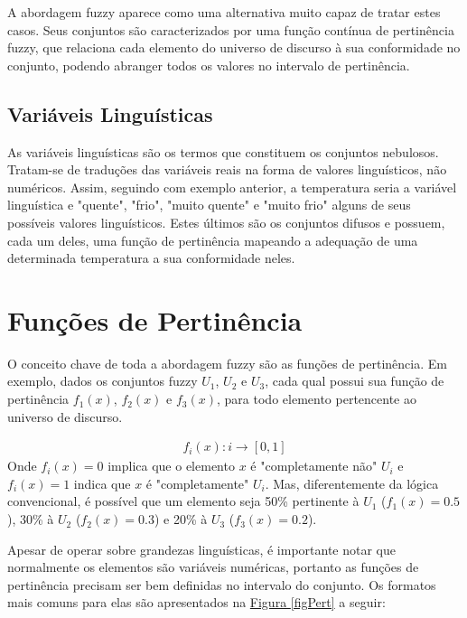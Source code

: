 A abordagem fuzzy aparece como uma alternativa muito capaz de tratar estes casos. Seus conjuntos são caracterizados por uma função contínua de pertinência fuzzy, que relaciona cada elemento do universo de discurso à sua conformidade no conjunto, podendo abranger todos os valores no intervalo de pertinência.

\subsection{Variáveis Linguísticas}
As variáveis linguísticas são os termos que constituem os conjuntos nebulosos. Tratam-se de traduções das variáveis reais na forma de valores linguísticos, não numéricos. Assim, seguindo com exemplo anterior, a temperatura seria a variável linguística e "quente", "frio", "muito quente" e "muito frio" alguns de seus possíveis valores linguísticos. Estes últimos são os conjuntos difusos e possuem, cada um deles, uma função de pertinência mapeando a adequação de uma determinada temperatura a sua conformidade neles.

\section{Funções de Pertinência}
\label{secFncPert}
O conceito chave de toda a abordagem fuzzy são as funções de pertinência. Em exemplo, dados os conjuntos fuzzy $U_1$, $U_2$ e $U_3$, cada qual possui sua função de pertinência $f_1(x)$, $f_2(x)$ e $f_3(x)$, para todo elemento pertencente ao universo de discurso.

\begin{align}
	f_i(x) : i \rightarrow [0,1]
	\label{eqFuncPertFuzzy}
\end{align}
Onde $f_i(x)=0$ implica que o elemento $x$ é "completamente não" $U_i$ e $f_i(x)=1$ indica que $x$ é "completamente" $U_i$. Mas, diferentemente da lógica convencional, é possível que um elemento seja 50\% pertinente à $U_1$ ($f_1(x)=0.5$), 30\%  à $U_2$ ($f_2(x)=0.3$) e 20\%  à $U_3$ ($f_3(x)=0.2$).

Apesar de operar sobre grandezas linguísticas, é importante notar que normalmente os elementos são variáveis numéricas, portanto as funções de pertinência precisam ser bem definidas no intervalo do conjunto. Os formatos mais comuns para elas são apresentados na \hyperref[figPert]{Figura \ref{figPert}} a seguir:

